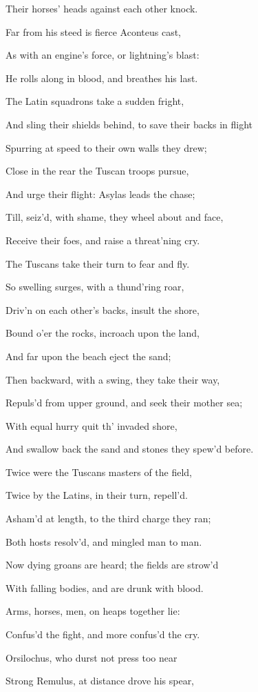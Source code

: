 Their horses’ heads against each other knock.

Far from his steed is fierce Aconteus cast,

As with an engine’s force, or lightning’s blast:

He rolls along in blood, and breathes his last.

The Latin squadrons take a sudden fright,

And sling their shields behind, to save their backs in flight

Spurring at speed to their own walls they drew;

Close in the rear the Tuscan troops pursue,

And urge their flight: Asylas leads the chase;

Till, seiz’d, with shame, they wheel about and face,

Receive their foes, and raise a threat’ning cry.

The Tuscans take their turn to fear and fly.

So swelling surges, with a thund’ring roar,

Driv’n on each other’s backs, insult the shore,

Bound o’er the rocks, incroach upon the land,

And far upon the beach eject the sand;

Then backward, with a swing, they take their way,

Repuls’d from upper ground, and seek their mother sea;

With equal hurry quit th’ invaded shore,

And swallow back the sand and stones they spew’d before.

Twice were the Tuscans masters of the field,

Twice by the Latins, in their turn, repell’d.

Asham’d at length, to the third charge they ran;

Both hosts resolv’d, and mingled man to man.

Now dying groans are heard; the fields are strow’d

With falling bodies, and are drunk with blood.

Arms, horses, men, on heaps together lie:

Confus’d the fight, and more confus’d the cry.

Orsilochus, who durst not press too near

Strong Remulus, at distance drove his spear,

